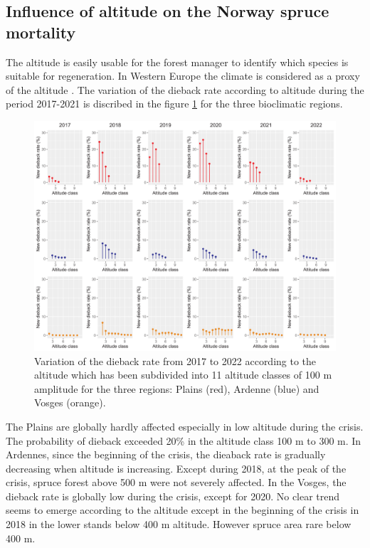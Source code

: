 \documentclass[3p,procedia]{elsarticle}
\begin{document}
\subsection{ Influence of altitude on the Norway spruce mortality}
The altitude is easily usable for the forest manager to identify which species is suitable for regeneration.
In Western Europe the climate is considered as a proxy of the altitude \citep{faccoli_composition_2014}. 
The variation of the dieback rate according to altitude during the period 2017-2021 is discribed in the figure \ref{alti_sco} for the three bioclimatic regions.
\begin{figure}[htbp] 
\centering
	\includegraphics[width=\textwidth]{synthese_color_11_2022.png}
     \caption{Variation of the dieback rate from 2017 to 2022 according to the altitude which has been subdivided into 11 altitude classes of 100 m amplitude for the three regions: Plains (red), Ardenne (blue) and Vosges (orange). 
}
	\label{alti_sco}
\end{figure}
The Plains are globally hardly  affected especially in low altitude during the crisis.
The probability of dieback exceeded 20\% in the altitude class 100 m to 300 m.
In Ardennes, since the beginning of the crisis, the dieaback rate is gradually decreasing when altitude is increasing.
Except during 2018, at the peak of the crisis, spruce forest above 500 m were not severely affected.
In the Vosges, the dieback rate is globally low during the crisis, except for 2020.
No clear trend seems to emerge according to the altitude except in the beginning of the crisis in 2018 in the lower stands below 400 m altitude.
However spruce area rare below 400 m.
\end{document}
